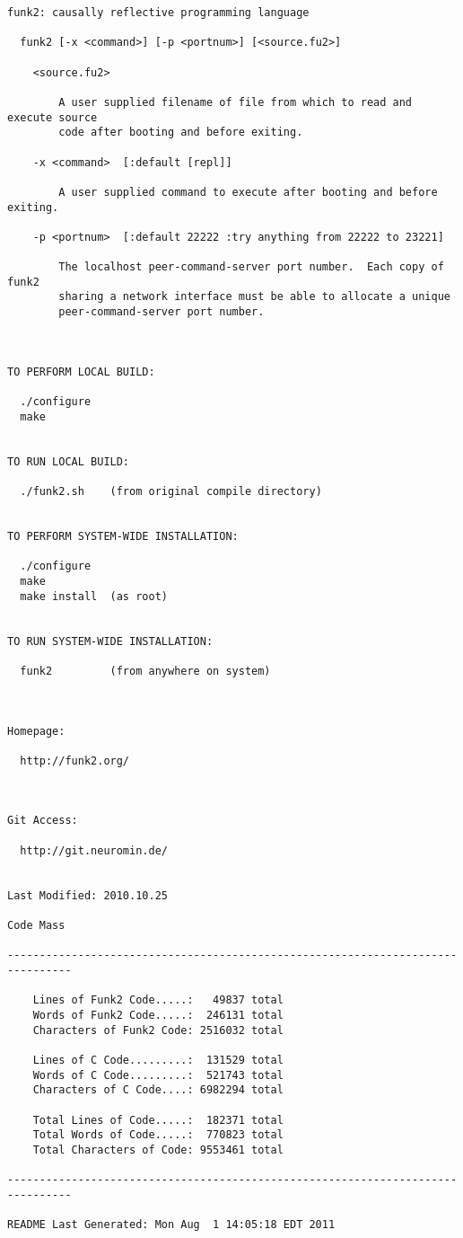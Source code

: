 \lstset{basicstyle=\scriptsize}
\begin{lstlisting}
funk2: causally reflective programming language

  funk2 [-x <command>] [-p <portnum>] [<source.fu2>]

    <source.fu2>

        A user supplied filename of file from which to read and execute source
        code after booting and before exiting.

    -x <command>  [:default [repl]]

        A user supplied command to execute after booting and before exiting.

    -p <portnum>  [:default 22222 :try anything from 22222 to 23221]

        The localhost peer-command-server port number.  Each copy of funk2
        sharing a network interface must be able to allocate a unique
        peer-command-server port number.



TO PERFORM LOCAL BUILD:

  ./configure
  make


TO RUN LOCAL BUILD:

  ./funk2.sh    (from original compile directory)


TO PERFORM SYSTEM-WIDE INSTALLATION:

  ./configure
  make
  make install  (as root)


TO RUN SYSTEM-WIDE INSTALLATION:

  funk2         (from anywhere on system)



Homepage:

  http://funk2.org/



Git Access:

  http://git.neuromin.de/


Last Modified: 2010.10.25

Code Mass

--------------------------------------------------------------------------------

    Lines of Funk2 Code.....:   49837 total
    Words of Funk2 Code.....:  246131 total
    Characters of Funk2 Code: 2516032 total

    Lines of C Code.........:  131529 total
    Words of C Code.........:  521743 total
    Characters of C Code....: 6982294 total

    Total Lines of Code.....:  182371 total
    Total Words of Code.....:  770823 total
    Total Characters of Code: 9553461 total

--------------------------------------------------------------------------------

README Last Generated: Mon Aug  1 14:05:18 EDT 2011
\end{lstlisting}

